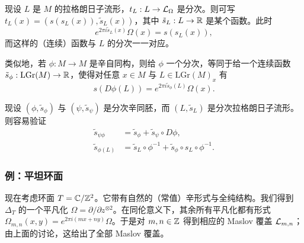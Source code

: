 
现设 $L$ 是 $M$ 的拉格朗日子流形，$t_L: L\to\mathcal{L}_\Omega$ 是分次。则可写 $t_L(x)=(s(s_L(x)),\tilde s_L(x))$，其中 $\tilde s_L: L\to\mathbb{R}$ 是某个函数。此时
\[
  e^{2\pi i\tilde s_L(x)}\Omega(x) = s(s_L(x)),
\]
而这样的（连续）函数与 $L$ 的分次一一对应。

类似地，若 $\phi: M\to M$ 是辛自同构，则给 $\phi$ 一个分次，等同于给一个连续函数 $\tilde s_\phi: \mathrm{LGr}(M)\to\mathbb{R}$，使得对任意 $x\in M$ 与 $L\in\mathrm{LGr}(M)_x$ 有
\[
  s(D\phi(L)) = e^{2\pi i\tilde s_\phi(L)}\Omega(x).
\]


现设 $(\phi,\tilde s_\phi)$ 与 $(\psi,\tilde s_\psi)$ 是分次辛同胚，而 $(L,\tilde s_L)$ 是分次拉格朗日子流形。则容易验证
\begin{align*}
  \tilde s_{\psi\phi} &= \tilde s_\phi + \tilde s_\psi\circ D\phi,\\
  \tilde s_{\phi(L)} &= \tilde s_L\circ\phi^{-1} + \tilde s_\phi\circ s_L\circ\phi^{-1}.
\end{align*}


\subsubsection{例：平坦环面}
\label{subsec:maslov}

现在考虑环面 $T=\mathbb{C}/\mathbb{Z}^2$。它带有自然的（常值）辛形式与全纯结构。我们得到 $\Delta_T$ 的一个平凡化 $\Omega=\partial/\partial z^{\otimes 2}$。在同伦意义下，其余所有平凡化都有形式 $\Omega_{m,n}(x,y)=e^{2\pi i(mx+ny)}\Omega$。于是对 $m,n\in\mathbb{Z}$ 得到相应的 Maslov 覆盖 $\mathcal{L}_{m,n}$；由上面的讨论，这给出了全部 Maslov 覆盖。

